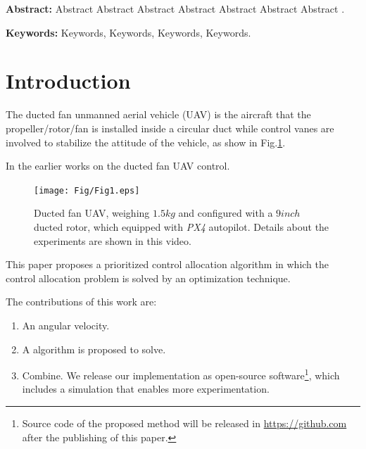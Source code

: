 





\textbf{Abstract: }Abstract Abstract Abstract Abstract Abstract Abstract Abstract .

\textbf{Keywords: }Keywords, Keywords, Keywords, Keywords.


\setlength{\parindent}{2em} 
\section{Introduction}
\label{intro}
The ducted fan unmanned aerial vehicle (UAV) is the aircraft that the propeller/rotor/fan is installed inside a circular duct while control vanes are involved to stabilize the attitude of the vehicle, as show in Fig.\ref{fig:1}. 
	
	In the earlier works on the ducted fan UAV control\cite{RN35,RN45}. 
	
	\begin{figure}[tb]
		\centering
		\texttt{[image: Fig/Fig1.eps]}
		\caption{Ducted fan UAV, weighing $1.5 kg$ and configured with a $9 inch$ ducted rotor, which equipped with {\it PX4} autopilot. Details about the experiments are shown in this video\protect\footnotemark[1].}
		\label{fig:1}     
	\end{figure}
	
	This paper proposes a prioritized control allocation algorithm in which the control allocation problem is solved by an optimization technique. 	
	
	The contributions of this work are:
	\begin{enumerate}
		\item An angular velocity.
		
		\item A algorithm is proposed to solve.
		
		\item Combine. We release our implementation as open-source software\footnote[2]{Source code of the proposed method will be released in \url{https://github.com} after the publishing of this paper.}, which includes a simulation that enables more experimentation.
	\end{enumerate}

